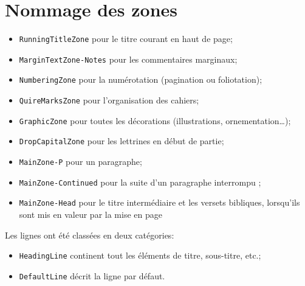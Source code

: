 \documentclass[final, fra]{anthology-ch}      %
\begin{document}
\appendix

\section{Nommage des zones}
\label{appdx:ladas}

\vspace{0.1cm}
\begin{itemize}
    \item \texttt{RunningTitleZone} pour le titre courant en haut de page;
    \item \texttt{MarginTextZone-Notes} pour les commentaires marginaux;
    \item \texttt{NumberingZone} pour la numérotation (pagination ou foliotation);
    \item \texttt{QuireMarksZone} pour l'organisation des cahiers;
    \item \texttt{GraphicZone} pour toutes les décorations (illustrations, ornementation…);
    \item \texttt{DropCapitalZone} pour les lettrines en début de partie;
    \item \texttt{MainZone-P} pour un paragraphe;
    \item \texttt{MainZone-Continued} pour la suite d'un paragraphe interrompu ;
    \item  \texttt{MainZone-Head} pour le titre intermédiaire et les versets bibliques, lorsqu'ils sont mis en valeur par la mise en page
\end{itemize}
\vspace{0.1cm}
Les lignes ont été classées en deux catégories:
\vspace{0.1cm}
\begin{itemize}
    \item \texttt{HeadingLine} continent tout les éléments de titre, sous-titre, etc.;
    \item \texttt{DefaultLine} décrit la ligne par défaut.
\end{itemize}

\end{document}

